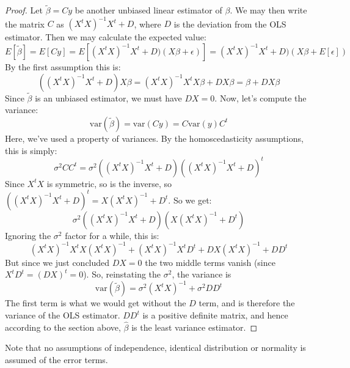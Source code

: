 \documentclass[12pt, a4paper]{article}
\numberwithin{equation}{section}
\begin{document}
\begin{proof}
Let $\tilde{\beta}=Cy$ be another unbiased linear estimator of $\beta$. We may  then write the matrix $C$ as $(X^t X)^{-1}X^t+D$, where $D$ is the deviation from the OLS estimator. Then we may calculate the expected value:
\begin{equation}
E[\tilde{\beta}]=E[Cy]=E[(X^t X)^{-1}X^t+D)(X\beta+\epsilon)]=(X^t X)^{-1}X^t+D)(X\beta+E[\epsilon])
\end{equation}
By the first assumption this is:
\begin{equation}
((X^t X)^{-1}X^t+D)X\beta=(X^t X)^{-1}X^t X\beta+DX\beta=\beta+DX\beta
\end{equation}
Since $\tilde{\beta}$ is an unbiased estimator, we must have $DX=0$. Now, let's compute the variance:
\begin{equation}
\textrm{var}(\tilde{\beta})=\textrm{var}(Cy)=C\textrm{var}(y)C^t
\end{equation}
Here, we've used a property of variances. By the homoscedasticity assumptions, this is simply:
\begin{equation}
\sigma^2 CC^t=\sigma^2((X^t X)^{-1}X^t+D)((X^t X)^{-1}X^t+D)^t
\end{equation}
Since $X^t X$ is symmetric, so is the inverse, so $((X^t X)^{-1}X^t+D)^t=X(X^t X)^{-1}+D^t$. So we get:
\begin{equation}
\sigma^2((X^t X)^{-1}X^t+D)(X(X^t X)^{-1}+D^t)
\end{equation}
Ignoring the $\sigma^2$ factor for a while, this is:
\begin{equation}
(X^t X)^{-1}X^tX(X^t X)^{-1}+(X^t X)^{-1}X^tD^t+DX(X^t X)^{-1}+DD^t
\end{equation}
But since we just concluded $DX=0$ the two middle terms vanish (since $X^tD^t=(DX)^t=0$). So, reinstating the $\sigma^2$, the variance is
\begin{equation}
\textrm{var}(\tilde{\beta})=\sigma^2(X^t X)^{-1}+\sigma^2 DD^t
\end{equation}
The first term is what we would get without the $D$ term, and is therefore the variance of the OLS estimator. $DD^t$ is a positive definite matrix, and hence according to the section above, $\hat{\beta}$ is the least variance estimator.
\end{proof}

Note that no assumptions of independence, identical distribution or normality is assumed of the error terms.
\end{document}

